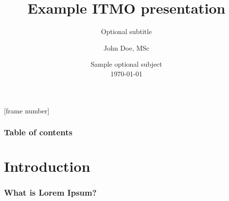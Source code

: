 \documentclass[
	11pt,
	aspectratio=169,
]{beamer}
\title[ITMO example]{Example ITMO presentation} %
\subtitle{Optional subtitle} %
\author[Doe]{John Doe, MSc} %
\institute[ITMO]{ITMO University, johndoe@mail.com} %
\date[\today]{
    Sample optional subject
    \\ \today} %
\begin{document}
\begin{frame}
	\titlepage %
\end{frame}
[frame number]



\begin{frame}
	\frametitle{Table of contents} %

	\tableofcontents %
\end{frame}


\section{Introduction}
\begin{frame}
	\frametitle{What is Lorem Ipsum?}
    \lipsum[1][1-3]
\end{frame}
\end{document}
